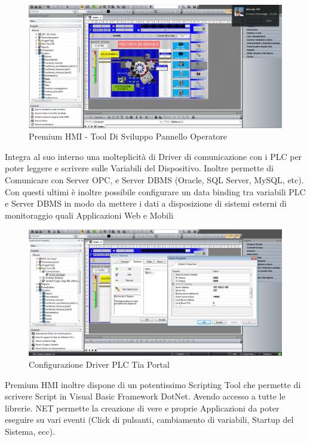 \documentclass[12pt, a4paper, oneside]{book}
\begin{document}
	\begin{figure}[H]
	\centering
	\includegraphics[width=13cm]{Immagini/HMI1}
	\caption{Premium HMI - Tool Di Sviluppo Pannello Operatore}
	\label{HMI1}
\end{figure}

Integra al suo interno una molteplicità di Driver di comunicazione con i PLC per poter leggere e scrivere sulle Variabili del Dispositivo. Inoltre permette di Comunicare con Server OPC, e Server DBMS (Oracle, SQL Server, MySQL, etc). Con questi ultimi è inoltre possibile configurare un data binding tra variabili PLC e Server DBMS in modo da mettere i dati a disposizione di sistemi esterni di monitoraggio quali Applicazioni Web e Mobili

	\begin{figure}[H]
	\centering
	\includegraphics[width=13cm]{Immagini/HMI2}
	\caption{Configurazione Driver PLC Tia Portal}
	\label{HMI2}
\end{figure}

Premium HMI inoltre dispone di un potentissimo Scripting Tool che permette di scrivere Script in Visual Basic Framework DotNet. Avendo accesso a tutte le librerie. NET permette la creazione di vere e proprie Applicazioni da poter eseguire su vari eventi (Click di pulsanti, cambiamento di variabili, Startup del Sistema, ecc).
\end{document}
